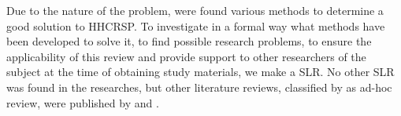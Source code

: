 Due to the nature of the problem, were found various methods to determine a good solution to \ac{HHCRSP}. To investigate in a formal way what methods have been developed to solve it, to find possible research problems, to ensure the applicability of this review and provide support to other researchers of the subject at the time of obtaining study materials, we make a \ac{SLR}.
No other \ac{SLR} was found in the researches, but other literature reviews, classified by \cite{Kitchenham:2007} as ad-hoc review, were published by \cite{fikar:2017} and \cite{mohamed:2017}.

